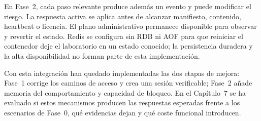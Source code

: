 En Fase~2, cada paso relevante produce además un evento y puede modificar el riesgo. La respuesta activa se aplica antes de alcanzar manifiesto, contenido, heartbeat o licencia. El plano administrativo permanece disponible para observar y revertir el estado. Redis se configura sin RDB ni AOF para que reiniciar el contenedor deje el laboratorio en un estado conocido; la persistencia duradera y la alta disponibilidad no forman parte de esta implementación.

Con esta integración han quedado implementadas las dos etapas de mejora: Fase~1 corrige los caminos de acceso y crea una sesión verificable; Fase~2 añade memoria del comportamiento y capacidad de bloqueo. En el Capítulo~7 se ha evaluado si estos mecanismos producen las respuestas esperadas frente a los escenarios de Fase~0, qué evidencias dejan y qué coste funcional introducen.
